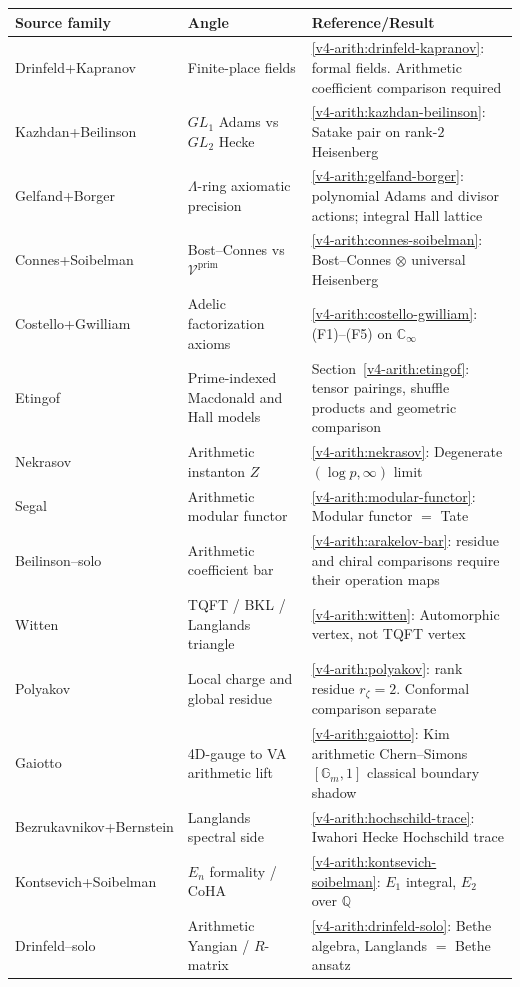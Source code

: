 \begin{longtable}{p{2.2cm}p{4.0cm}p{5.3cm}}
\toprule
Source family & Angle & Reference/Result \\
\midrule
Drinfeld+\allowbreak{}Kapranov & Finite-place fields & \ref{v4-arith:drinfeld-kapranov}: formal fields. Arithmetic coefficient comparison required \\
Kazhdan+\allowbreak{}Beilinson & \(GL_{1}\) Adams vs \(GL_{2}\) Hecke & \ref{v4-arith:kazhdan-beilinson}: Satake pair on rank-\(2\) Heisenberg \\
Gelfand+\allowbreak{}Borger & \(\Lambda\)-ring axiomatic precision & \ref{v4-arith:gelfand-borger}: polynomial Adams and divisor actions; integral Hall lattice \\
Connes+\allowbreak{}Soibelman & Bost--Connes vs \(\mathcal{V}^{\mathrm{prim}}\) & \ref{v4-arith:connes-soibelman}: Bost--Connes \(\otimes\) universal Heisenberg \\
Costello+\allowbreak{}Gwilliam & Adelic factorization axioms & \ref{v4-arith:costello-gwilliam}: (F1)--(F5) on \(\mathbb{C}_{\infty}\) \\
Etingof & Prime-indexed Macdonald and Hall models & Section~\ref{v4-arith:etingof}: tensor pairings, shuffle products and geometric comparison \\
Nekrasov & Arithmetic instanton \(Z\) & \ref{v4-arith:nekrasov}: Degenerate \((\log p,\infty)\) limit \\
Segal & Arithmetic modular functor & \ref{v4-arith:modular-functor}: Modular functor \(=\) Tate \\
Beilinson--solo & Arithmetic coefficient bar & \ref{v4-arith:arakelov-bar}: residue and chiral comparisons require their operation maps \\
Witten & TQFT / BKL / Langlands triangle & \ref{v4-arith:witten}: Automorphic vertex, not TQFT vertex \\
Polyakov & Local charge and global residue & \ref{v4-arith:polyakov}: rank residue \(r_\zeta=2\). Conformal comparison separate \\
Gaiotto & 4D-gauge to VA arithmetic lift & \ref{v4-arith:gaiotto}: Kim arithmetic Chern--Simons \([\mathbb{G}_{m},1]\) classical boundary shadow \\
Bezrukavnikov+\allowbreak{}Bernstein & Langlands spectral side & \ref{v4-arith:hochschild-trace}: Iwahori Hecke Hochschild trace \\
Kontsevich+\allowbreak{}Soibelman & \(E_{n}\) formality / CoHA & \ref{v4-arith:kontsevich-soibelman}: \(E_{1}\) integral, \(E_{2}\) over \(\mathbb{Q}\) \\
Drinfeld--solo & Arithmetic Yangian / \(R\)-matrix & \ref{v4-arith:drinfeld-solo}: Bethe algebra, Langlands \(=\) Bethe ansatz \\
\bottomrule
\end{longtable}

